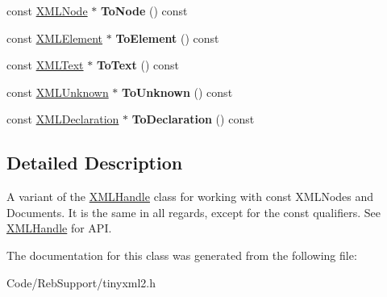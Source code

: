 \begin{DoxyCompactItemize}
\item 
const \hyperlink{classtinyxml2_1_1_x_m_l_node}{X\+M\+L\+Node} $\ast$ {\bfseries To\+Node} () const \hypertarget{classtinyxml2_1_1_x_m_l_const_handle_a95d0256318c10c3f75fa5f8ffb3e4bc1}{}\label{classtinyxml2_1_1_x_m_l_const_handle_a95d0256318c10c3f75fa5f8ffb3e4bc1}

\item 
const \hyperlink{classtinyxml2_1_1_x_m_l_element}{X\+M\+L\+Element} $\ast$ {\bfseries To\+Element} () const \hypertarget{classtinyxml2_1_1_x_m_l_const_handle_a5a48adefc2a5e70d4ce5b55692a0e2f9}{}\label{classtinyxml2_1_1_x_m_l_const_handle_a5a48adefc2a5e70d4ce5b55692a0e2f9}

\item 
const \hyperlink{classtinyxml2_1_1_x_m_l_text}{X\+M\+L\+Text} $\ast$ {\bfseries To\+Text} () const \hypertarget{classtinyxml2_1_1_x_m_l_const_handle_ad86ca7dbb20d0495ae357fe7a866e0be}{}\label{classtinyxml2_1_1_x_m_l_const_handle_ad86ca7dbb20d0495ae357fe7a866e0be}

\item 
const \hyperlink{classtinyxml2_1_1_x_m_l_unknown}{X\+M\+L\+Unknown} $\ast$ {\bfseries To\+Unknown} () const \hypertarget{classtinyxml2_1_1_x_m_l_const_handle_acb358a329e54fa204ed2d0b181566828}{}\label{classtinyxml2_1_1_x_m_l_const_handle_acb358a329e54fa204ed2d0b181566828}

\item 
const \hyperlink{classtinyxml2_1_1_x_m_l_declaration}{X\+M\+L\+Declaration} $\ast$ {\bfseries To\+Declaration} () const \hypertarget{classtinyxml2_1_1_x_m_l_const_handle_a5de0c175845bc30a6f9b3d88d8877eaf}{}\label{classtinyxml2_1_1_x_m_l_const_handle_a5de0c175845bc30a6f9b3d88d8877eaf}

\end{DoxyCompactItemize}


\subsection{Detailed Description}
A variant of the \hyperlink{classtinyxml2_1_1_x_m_l_handle}{X\+M\+L\+Handle} class for working with const X\+M\+L\+Nodes and Documents. It is the same in all regards, except for the \textquotesingle{}const\textquotesingle{} qualifiers. See \hyperlink{classtinyxml2_1_1_x_m_l_handle}{X\+M\+L\+Handle} for A\+PI. 

The documentation for this class was generated from the following file\+:\begin{DoxyCompactItemize}
\item 
Code/\+Reb\+Support/tinyxml2.\+h\end{DoxyCompactItemize}
